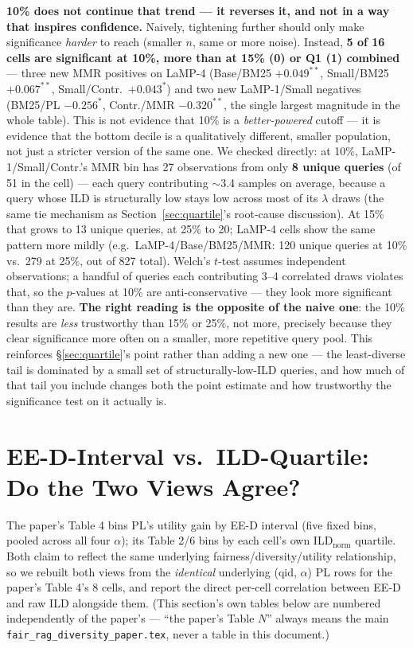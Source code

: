 \documentclass[10pt]{article}
\begin{document}
\textbf{10\% does not continue that trend --- it reverses it, and not in a way
that inspires confidence.} Naively, tightening further should only make
significance \emph{harder} to reach (smaller $n$, same or more noise). Instead,
\textbf{5 of 16 cells are significant at 10\%, more than at 15\% (0) or Q1 (1)
combined} --- three new MMR positives on LaMP-4 (Base/BM25 $+0.049^{**}$,
Small/BM25 $+0.067^{**}$, Small/Contr.\ $+0.043^{*}$) and two new LaMP-1/Small
negatives (BM25/PL $-0.256^{*}$, Contr./MMR $-0.320^{**}$, the single largest
magnitude in the whole table). This is not evidence that 10\% is a
\emph{better-powered} cutoff --- it is evidence that the bottom decile is a
qualitatively different, smaller population, not just a stricter version of the
same one. We checked directly: at 10\%, LaMP-1/Small/Contr.'s MMR bin has 27
observations from only \textbf{8 unique queries} (of 51 in the cell) --- each
query contributing $\sim$3.4 samples on average, because a query whose ILD is
structurally low stays low across most of its $\lambda$ draws (the same tie
mechanism as Section~\ref{sec:quartile}'s root-cause discussion). At 15\% that
grows to 13 unique queries, at 25\% to 20; LaMP-4 cells show the same pattern
more mildly (e.g.\ LaMP-4/Base/BM25/MMR: 120 unique queries at 10\% vs.\ 279 at
25\%, out of 827 total). Welch's $t$-test assumes independent observations; a
handful of queries each contributing 3--4 correlated draws violates that, so the
$p$-values at 10\% are anti-conservative --- they look more significant than they
are. \textbf{The right reading is the opposite of the naive one}: the 10\%
results are \emph{less} trustworthy than 15\% or 25\%, not more, precisely
because they clear significance more often on a smaller, more repetitive query
pool. This reinforces \S\ref{sec:quartile}'s point rather than adding a new one
--- the least-diverse tail is dominated by a small set of structurally-low-ILD
queries, and how much of that tail you include changes both the point estimate
and how trustworthy the significance test on it actually is.

\FloatBarrier
\section{EE-D-Interval vs.\ ILD-Quartile: Do the Two Views Agree?}
\label{sec:eed-ild}

The paper's Table 4 bins PL's utility gain by EE-D interval (five fixed bins,
pooled across all four $\alpha$); its Table 2/6 bins by each cell's own
ILD$_{\text{norm}}$ quartile. Both claim to reflect the same underlying
fairness/diversity/utility relationship, so we rebuilt both views from the
\emph{identical} underlying (qid, $\alpha$) PL rows for the paper's Table 4's 8
cells, and report the direct per-cell correlation between EE-D and raw ILD
alongside them. (This section's own tables below are numbered independently of the
paper's --- ``the paper's Table $N$'' always means the main
\texttt{fair\_rag\_diversity\_paper.tex}, never a table in this document.)
\end{document}

